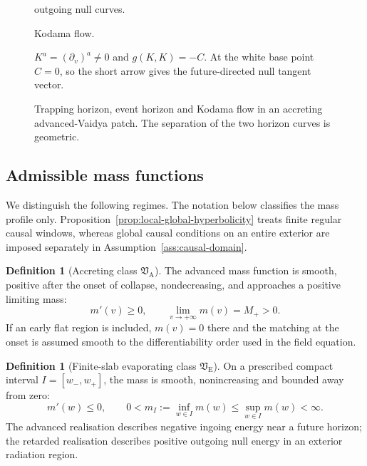 \documentclass[11pt,a4paper]{article}
\theoremstyle{definition}
\newtheorem{definition}[theorem]{Definition}
\theoremstyle{remark}
\begin{document}
\begin{figure}[htbp]
\begin{minipage}[c]{0.36\textwidth}
			\medskip
			\quad outgoing null curves.
			
			\medskip
			\quad Kodama flow.
			
			\smallskip
			$K^a=(\partial_v)^a\neq0$ and $g(K,K)=-C$.  At the white base point
			$C=0$, so the short arrow gives the future-directed null tangent vector.
		\end{minipage}
		\caption{Trapping horizon, event horizon and Kodama flow in an accreting
			advanced-Vaidya patch.  The separation of the two horizon curves is
			geometric.}
		\label{fig:Vaidya-horizons-Kodama}
	\end{figure}
	
	\subsection{Admissible mass functions}
	
	We distinguish the following regimes.  The notation below classifies the mass
	profile only.  Proposition~\ref{prop:local-global-hyperbolicity} treats finite
	regular causal windows, whereas global causal conditions on an entire
	exterior are imposed separately in Assumption~\ref{ass:causal-domain}.
	
	\begin{definition}[Accreting class $\mathfrak V_{\mathrm A}$]
		The advanced mass function is smooth, positive after the onset of collapse,
		nondecreasing, and approaches a positive limiting mass:
		\begin{equation}
			m'(v)\geq0,
			\qquad
			\lim_{v\to+\infty}m(v)=M_+>0.
		\end{equation}
		If an early flat region is included, $m(v)=0$ there and the matching at the
		onset is assumed smooth to the differentiability order used in the field
		equation.
	\end{definition}
	
	\begin{definition}[Finite-slab evaporating class $\mathfrak V_{\mathrm E}$]
		On a prescribed compact interval $I=[w_-,w_+]$, the mass is smooth,
		nonincreasing and bounded away from zero:
		\begin{equation}
			m'(w)\leq0,
			\qquad
			0<m_I:=\inf_{w\in I}m(w)\leq \sup_{w\in I}m(w)<\infty.
		\end{equation}
		The advanced realisation describes negative ingoing energy near a future
		horizon; the retarded realisation describes positive outgoing null energy in
		an exterior radiation region.
	\end{definition}
	
\end{document}
